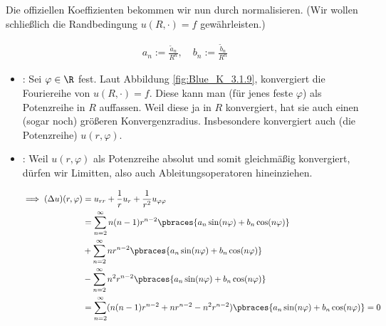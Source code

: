 \begin{solution}
\begin{enumerate}[label = (\roman*)]

    Die offiziellen Koeffizienten bekommen wir nun durch normalisieren.
    (Wir wollen schließlich die Randbedingung $u(R, \cdot) = f$ gewährleisten.)

    \begin{align*}
        a_n := \frac{\tilde{a}_n}{R^n},
        \quad
        b_n := \frac{\tilde{b}_n}{R^n}
    \end{align*}

    \begin{itemize}

        \item {}:
        Sei $\varphi \in \R$ fest.
        Laut Abbildung \ref{fig:Blue_K_3.1.9}, konvergiert die Fouriereihe von $u(R, \cdot) = f$.
        Diese kann man (für jenes feste $\varphi$) als Potenzreihe in $R$ auffassen.
        Weil diese ja in $R$ konvergiert, hat sie auch einen (sogar noch) größeren Konvergenzradius.
        Insbesondere konvergiert auch (die Potenzreihe) $u(r, \varphi)$.

        \item {}:
        Weil $u(r, \varphi)$ als Potenzreihe absolut und somit gleichmäßig konvergiert, dürfen wir Limitten, also auch Ableitungsoperatoren hineinziehen.

        \begin{align*}
            \implies
            (\Delta u)(r, \varphi)
            & =
            u_{rr} + \frac{1}{r} u_r + \frac{1}{r^2} u_{\varphi \varphi} \\
            & =
            \sum_{n=2}^\infty
            n (n-1) r^{n-2}
            \pbraces
            {
                a_n \sin(n \varphi)
                +
                b_n \cos(n \varphi)
            } \\
            & +
            \sum_{n=2}^\infty
            n r^{n-2}
            \pbraces
            {
                a_n \sin(n \varphi)
                +
                b_n \cos(n \varphi)
            } \\
            & -
            \sum_{n=2}^\infty
            n^2 r^{n-2}
            \pbraces
            {
                a_n \sin(n \varphi)
                +
                b_n \cos(n \varphi)
            } \\
            & =
            \sum_{n=2}^\infty
            (
                n (n-1) r^{n-2}
                +
                n r^{n-2}
                -
                n^2 r^{n-2}
            )
            \pbraces
            {
                a_n \sin(n \varphi)
                +
                b_n \cos(n \varphi)
            }
            = 0
        \end{align*}


\end{itemize}
\end{enumerate}
\end{solution}
